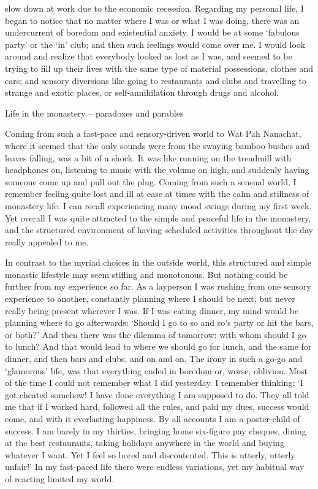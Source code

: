 slow down at work due to the economic recession. Regarding my personal
life, I began to notice that no matter where I was or what I was doing,
there was an undercurrent of boredom and existential anxiety. I would be
at some `fabulous party' or the `in' club; and then such feelings would
come over me. I would look around and realize that everybody looked as
lost as I was, and seemed to be trying to fill up their lives with the
same type of material possessions, clothes and cars; and sensory
diversions like going to restaurants and clubs and travelling to strange
and exotic places, or self-annihilation through drugs and alcohol.

Life in the monastery -- paradoxes and parables

Coming from such a fast-pace and sensory-driven world to Wat Pah
Nanachat, where it seemed that the only sounds were from the swaying
bamboo bushes and leaves falling, was a bit of a shock. It was like
running on the treadmill with headphones on, listening to music with the
volume on high, and suddenly having someone come up and pull out the
plug. Coming from such a sensual world, I remember feeling quite lost
and ill at ease at times with the calm and stillness of monastery life.
I can recall experiencing many mood swings during my first week. Yet
overall I was quite attracted to the simple and peaceful life in the
monastery, and the structured environment of having scheduled activities
throughout the day really appealed to me.

In contrast to the myriad choices in the outside world, this structured
and simple monastic lifestyle may seem stifling and monotonous. But
nothing could be further from my experience so far. As a layperson I was
rushing from one sensory experience to another, constantly planning
where I should be next, but never really being present wherever I was.
If I was eating dinner, my mind would be planning where to go
afterwards: `Should I go to so and so's party or hit the bars, or both?'
And then there was the dilemma of tomorrow: with whom should I go to
lunch? And that would lead to where we should go for lunch, and the same
for dinner, and then bars and clubs, and on and on. The irony in such a
go-go and `glamorous' life, was that everything ended in boredom or,
worse, oblivion. Most of the time I could not remember what I did
yesterday. I remember thinking: `I got cheated somehow! I have done
everything I am supposed to do. They all told me that if I worked hard,
followed all the rules, and paid my dues, success would come, and with
it everlasting happiness. By all accounts I am a poster-child of
success. I am barely in my thirties, bringing home six-figure pay
cheques, dining at the best restaurants, taking holidays anywhere in the
world and buying whatever I want. Yet I feel so bored and discontented.
This is utterly, utterly unfair!' In my fast-paced life there were
endless variations, yet my habitual way of reacting limited my world.

